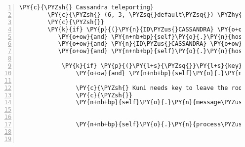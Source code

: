 \begin{Verbatim}[commandchars=\\\{\},numbers=left,firstnumber=1,stepnumber=1]
        \PY{c}{\PYZsh{} Cassandra teleporting}
        \PY{c}{\PYZsh{} (6, 3, \PYZsq{}default\PYZsq{}) \PYZhy{}\PYZgt{} Teleports Cassandra to room\PYZus{}kuni}
        \PY{c}{\PYZsh{}}
        \PY{k}{if} \PY{p}{(}\PY{n}{ID\PYZus{}CASSANDRA} \PY{o+ow}{in} \PY{n+nb+bp}{self}\PY{o}{.}\PY{n}{host}\PY{o}{.}\PY{n}{room\PYZus{}by\PYZus{}client}\PY{o}{.}\PY{n}{keys}\PY{p}{(}\PY{p}{)}
           \PY{o+ow}{and} \PY{n+nb+bp}{self}\PY{o}{.}\PY{n}{host}\PY{o}{.}\PY{n}{room\PYZus{}by\PYZus{}client}\PY{p}{[}\PY{n}{ID\PYZus{}CASSANDRA}\PY{p}{]}\PY{o}{.}\PY{n}{identifier} \PY{o}{==} \PY{l+s}{\PYZdq{}}\PY{l+s}{default}\PY{l+s}{\PYZdq{}}
           \PY{o+ow}{and} \PY{n}{ID\PYZus{}CASSANDRA} \PY{o+ow}{in} \PY{n+nb+bp}{self}\PY{o}{.}\PY{n}{host}\PY{o}{.}\PY{n}{room\PYZus{}by\PYZus{}client}\PY{p}{[}\PY{n}{ID\PYZus{}CASSANDRA}\PY{p}{]}\PY{o}{.}\PY{n}{entity\PYZus{}locations}\PY{o}{.}\PY{n}{keys}\PY{p}{(}\PY{p}{)}
           \PY{o+ow}{and} \PY{n+nb+bp}{self}\PY{o}{.}\PY{n}{host}\PY{o}{.}\PY{n}{room\PYZus{}by\PYZus{}client}\PY{p}{[}\PY{n}{ID\PYZus{}CASSANDRA}\PY{p}{]}\PY{o}{.}\PY{n}{entity\PYZus{}locations}\PY{p}{[}\PY{n}{ID\PYZus{}CASSANDRA}\PY{p}{]} \PY{o}{==} \PY{p}{(}\PY{l+m+mi}{6}\PY{p}{,} \PY{l+m+mi}{3}\PY{p}{)}\PY{p}{)}\PY{p}{:}

            \PY{k}{if} \PY{p}{(}\PY{l+s}{\PYZsq{}}\PY{l+s}{key}\PY{l+s}{\PYZsq{}} \PY{o+ow}{in} \PY{n+nb+bp}{self}\PY{o}{.}\PY{n}{host}\PY{o}{.}\PY{n}{rack}\PY{o}{.}\PY{n}{owner\PYZus{}dict}\PY{o}{.}\PY{n}{keys}\PY{p}{(}\PY{p}{)}
                \PY{o+ow}{and} \PY{n+nb+bp}{self}\PY{o}{.}\PY{n}{host}\PY{o}{.}\PY{n}{rack}\PY{o}{.}\PY{n}{owner\PYZus{}dict}\PY{p}{[}\PY{l+s}{\PYZsq{}}\PY{l+s}{key}\PY{l+s}{\PYZsq{}}\PY{p}{]} \PY{o}{==} \PY{n}{ID\PYZus{}CASSANDRA}\PY{p}{)}\PY{p}{:}

                \PY{c}{\PYZsh{} Kuni needs key to leave the room, Cassandra is not allowed to leave}
                \PY{c}{\PYZsh{}}
                \PY{n+nb+bp}{self}\PY{o}{.}\PY{n}{message\PYZus{}for\PYZus{}host}\PY{o}{.}\PY{n}{event\PYZus{}list}\PY{o}{.}\PY{n}{append}\PY{p}{(}\PY{n}{fabula}\PY{o}{.}\PY{n}{PerceptionEvent}\PY{p}{(}\PY{n}{ID\PYZus{}CASSANDRA}\PY{p}{,}
                                                                               \PY{l+s}{\PYZsq{}}\PY{l+s}{Du bist zu schwer um mit dem }\PY{l+s}{\PYZsq{}}
                                                                               \PY{l+s}{\PYZsq{}}\PY{l+s}{Schlüssel über den Fluss zu fliegen.}\PY{l+s}{\PYZsq{}}\PY{p}{)}\PY{p}{)}
                \PY{n+nb+bp}{self}\PY{o}{.}\PY{n}{process\PYZus{}TriesToMoveEvent}\PY{p}{(}\PY{n}{fabula}\PY{o}{.}\PY{n}{TriesToMoveEvent}\PY{p}{(}\PY{n}{ID\PYZus{}CASSANDRA}\PY{p}{,}
                                                                      \PY{p}{(}\PY{l+m+mi}{6}\PY{p}{,} \PY{l+m+mi}{2}\PY{p}{)}\PY{p}{)}\PY{p}{)}


\end{Verbatim}
